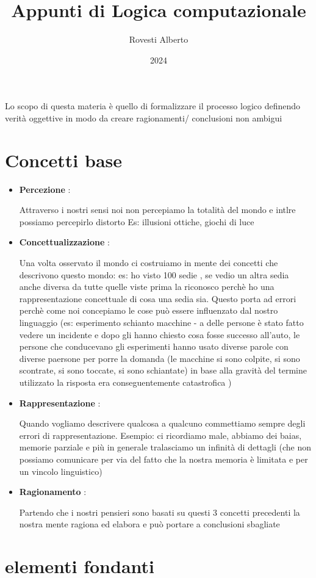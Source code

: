 \documentclass [12pt, letterpaper]{article}
\begin{document}
	\title{Appunti di Logica computazionale}
	\author{Rovesti Alberto}
	\date{2024}
	
	\maketitle
	
	Lo scopo di questa materia è quello di formalizzare il processo logico definendo verità oggettive in modo da creare ragionamenti/ conclusioni non ambigui
	
	
	
	\section{Concetti base}
	\begin{itemize}
		\item \textbf{Percezione} :
		
		Attraverso i nostri sensi noi non percepiamo la totalità del mondo e intlre possiamo percepirlo distorto Es: illusioni ottiche, giochi di luce 
		
		\item \textbf{Concettualizzazione} :
		
		Una volta osservato il mondo ci costruiamo in mente dei concetti che descrivono questo mondo: es:
		ho visto 100 sedie , se vedio un altra sedia anche diversa da tutte quelle viste prima la riconosco perchè ho una rappresentazione concettuale di cosa una sedia sia. Questo porta ad errori perchè come noi concepiamo le cose può essere influenzato dal nostro linguaggio (es: esperimento schianto macchine - a delle persone è stato fatto vedere un incidente e dopo gli hanno chiesto cosa fosse successo all'auto, le persone che conducevano gli esperimenti hanno usato diverse parole con diverse paersone per porre la domanda (le macchine si sono colpite, si sono scontrate, si sono toccate, si sono schiantate) in base alla gravità del termine utilizzato la risposta era conseguentemente catastrofica )
		
		\item \textbf{Rappresentazione} :
		
		Quando vogliamo descrivere qualcosa a qualcuno commettiamo sempre degli errori di rappresentazione. 
		Esempio: ci ricordiamo male, abbiamo dei baias, memorie parziale e più in generale tralasciamo un infinità di dettagli (che non possiamo comunicare per via del fatto che la nostra memoria è limitata e per un vincolo linguistico)
		
		\item \textbf{Ragionamento} :
		
		Partendo che i nostri pensieri sono basati su questi 3 concetti precedenti la nostra mente ragiona ed elabora e può portare a conclusioni sbagliate 
		
	\end{itemize}
	
	\section{elementi fondanti}
	
\end{document}
